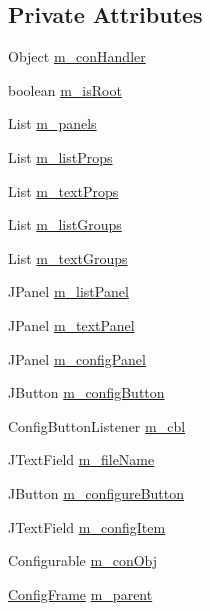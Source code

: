 \subsection*{Private Attributes}
\begin{DoxyCompactItemize}
\item 
Object \hyperlink{classorg_1_1jgap_1_1gui_1_1_config_frame_a9f94873bf7a289b5e75d4d7b0c232234}{m\-\_\-con\-Handler}
\item 
boolean \hyperlink{classorg_1_1jgap_1_1gui_1_1_config_frame_a878f1ba120803abd6d1c0409c680a12a}{m\-\_\-is\-Root}
\item 
List \hyperlink{classorg_1_1jgap_1_1gui_1_1_config_frame_ac4dbcce3d6c9d588ee5e845f83889c57}{m\-\_\-panels}
\item 
List \hyperlink{classorg_1_1jgap_1_1gui_1_1_config_frame_af9a22e41c6f8e0db03140b1fb05426aa}{m\-\_\-list\-Props}
\item 
List \hyperlink{classorg_1_1jgap_1_1gui_1_1_config_frame_a4f9867cc6c7504fdd9962cce88055a8c}{m\-\_\-text\-Props}
\item 
List \hyperlink{classorg_1_1jgap_1_1gui_1_1_config_frame_aa4f34f2ed29abfdf8557ef2afa27b0f2}{m\-\_\-list\-Groups}
\item 
List \hyperlink{classorg_1_1jgap_1_1gui_1_1_config_frame_adaeb8f407033d19e60df07253555e532}{m\-\_\-text\-Groups}
\item 
J\-Panel \hyperlink{classorg_1_1jgap_1_1gui_1_1_config_frame_aebbee8dd64cd6e2d2a0fa5bf11c2da16}{m\-\_\-list\-Panel}
\item 
J\-Panel \hyperlink{classorg_1_1jgap_1_1gui_1_1_config_frame_af1777986f345ff87ee09f6202590ecd7}{m\-\_\-text\-Panel}
\item 
J\-Panel \hyperlink{classorg_1_1jgap_1_1gui_1_1_config_frame_addfd6f9a6a488584fff8bc32f55c5856}{m\-\_\-config\-Panel}
\item 
J\-Button \hyperlink{classorg_1_1jgap_1_1gui_1_1_config_frame_aeb6a7f72fe02351f0a1a12d221378df6}{m\-\_\-config\-Button}
\item 
Config\-Button\-Listener \hyperlink{classorg_1_1jgap_1_1gui_1_1_config_frame_a517b0fcc9053a7e49526c06b35207761}{m\-\_\-cbl}
\item 
J\-Text\-Field \hyperlink{classorg_1_1jgap_1_1gui_1_1_config_frame_a8f91d29f5afe91acc604fc56e9b49137}{m\-\_\-file\-Name}
\item 
J\-Button \hyperlink{classorg_1_1jgap_1_1gui_1_1_config_frame_a34bfddcd6610f449dd8810a05c8244b1}{m\-\_\-configure\-Button}
\item 
J\-Text\-Field \hyperlink{classorg_1_1jgap_1_1gui_1_1_config_frame_a7dd7f3fe4062fb4d797f8beb9d4a616b}{m\-\_\-config\-Item}
\item 
Configurable \hyperlink{classorg_1_1jgap_1_1gui_1_1_config_frame_aa0f5b29073c5dcb21b1772000223ce8e}{m\-\_\-con\-Obj}
\item 
\hyperlink{classorg_1_1jgap_1_1gui_1_1_config_frame}{Config\-Frame} \hyperlink{classorg_1_1jgap_1_1gui_1_1_config_frame_a59f7c912b976ba4876ce3177bcde11ce}{m\-\_\-parent}
\end{DoxyCompactItemize}
